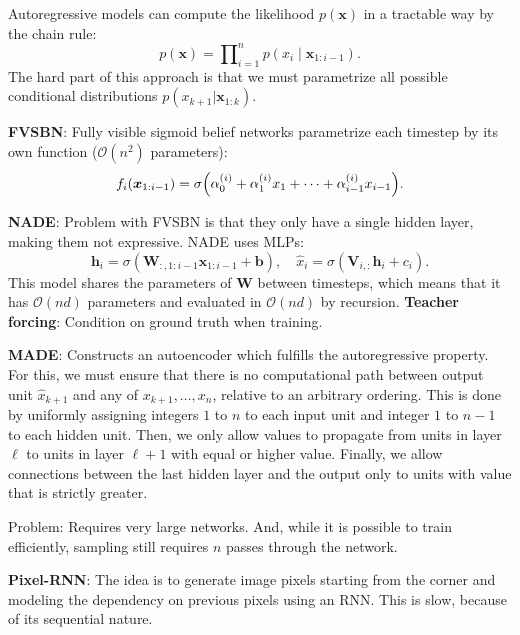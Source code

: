 \documentclass{article}
\newcommand{\lft}{\mathopen{}\mathclose\bgroup\left}
\newcommand{\rgt}{\aftergroup\egroup\right}
\renewcommand{\vec}[1]{\bm{#1}}
\newcommand{\mat}[1]{\bm{#1}}
\newenvironment{topic}[1]
{\textbf{\sffamily \colorbox{black}{\rlap{\textbf{\textcolor{white}{#1}}}\hspace{\linewidth}\hspace{-2\fboxsep}}} \\ \vspace{0.2cm}}
{}
\begin{document}
\begin{multicols*}{2}
\begin{topic}{Autoencoders}
    \end{topic}

    \begin{topic}{Autoregressive models}

        Autoregressive models can compute the likelihood $p(\vec{x})$ in a tractable way by the chain rule: \[
            p(\vec{x}) = \prod\nolimits_{i=1}^n p(x_i \mid \vec{x}_{1:i-1}).
        \]
        The hard part of this approach is that we must parametrize all possible conditional distributions
        $p(x_{k+1} | \vec{x}_{1:k})$.

        \textbf{FVSBN}: Fully visible sigmoid belief networks parametrize each timestep by its own
        function ($\mathcal{O}(n^2)$ parameters): \[
            f_i(\vec{x}_{1:i-1}) = \sigma \lft( \alpha_0^{(i)} + \alpha_1^{(i)} x_1 + \cdots + \alpha_{i-1}^{(i)} x_{i-1} \rgt).
        \]

        \textbf{NADE}: Problem with FVSBN is that they only have a single hidden layer, making them
        not expressive. NADE uses MLPs: \[
            \vec{h}_i = \sigma(\mat{W}_{:,1:i-1} \vec{x}_{1:i-1} + \vec{b}), \quad \hat{x}_i = \sigma(\mat{V}_{i,:} \vec{h}_i + c_i).
        \]
        This model shares the parameters of $\mat{W}$ between timesteps, which means that it has
        $\mathcal{O}(nd)$ parameters and evaluated in $\mathcal{O}(nd)$ by recursion. \textbf{Teacher
            forcing}: Condition on ground truth when training.

        \textbf{MADE}: Constructs an autoencoder which fulfills the autoregressive property. For this,
        we must ensure that there is no computational path between output unit $\hat{x}_{k+1}$ and
        any of $x_{k+1}, \ldots, x_n$, relative to an
        arbitrary ordering. This is done by uniformly assigning integers $1$ to $n$ to each input
        unit and integer $1$ to $n-1$ to each hidden unit. Then, we only allow values to propagate
        from units in layer $\ell$ to units in layer $\ell+1$ with equal or higher value. Finally,
        we allow connections between the last hidden layer and the output only to units with value
        that is strictly greater.

        Problem: Requires very large networks. And, while it is possible to train efficiently, sampling
        still requires $n$ passes through the network.

        \textbf{Pixel-RNN}: The idea is to generate image pixels starting from the corner and
        modeling the dependency on previous pixels using an RNN. This is slow, because of its
        sequential nature.


\end{topic}
\end{multicols*}
\end{document}
